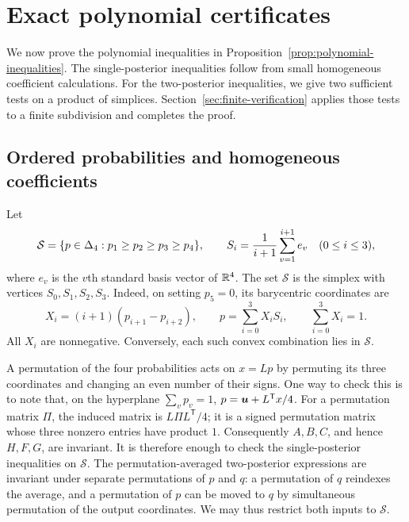 \section{Exact polynomial certificates}
\label{sec:polynomial-certificates}

We now prove the polynomial inequalities in
Proposition~\ref{prop:polynomial-inequalities}. The single-posterior
inequalities follow from small homogeneous coefficient calculations. For the
two-posterior inequalities, we give two sufficient tests on a product of
simplices. Section~\ref{sec:finite-verification} applies those tests to a
finite subdivision and completes the proof.

\subsection{Ordered probabilities and homogeneous coefficients}

Let
\[
 \mathcal S=\{p\in\Delta_4:p_1\ge p_2\ge p_3\ge p_4\},
 \qquad
 S_i=\frac{1}{i+1}\sum_{v=1}^{i+1}e_v
 \quad(0\le i\le3),
\]
where $e_v$ is the $v$th standard basis vector of $\mathbb R^4$.
The set $\mathcal S$ is the simplex with vertices $S_0,S_1,S_2,S_3$.
Indeed, on setting $p_5=0$, its barycentric coordinates are
\begin{equation}
 X_i=(i+1)(p_{i+1}-p_{i+2}),\qquad
 p=\sum_{i=0}^3X_iS_i,\qquad \sum_{i=0}^3X_i=1.
 \label{eq:ordered-barycentric}
\end{equation}
All $X_i$ are nonnegative. Conversely, each such convex combination lies
in $\mathcal S$.

A permutation of the four probabilities acts on $x=Lp$ by permuting its
three coordinates and changing an even number of their signs. One way to
check this is to note that, on the hyperplane $\sum_vp_v=1$,
$p=\boldsymbol u+L^{\mathsf T}x/4$. For a permutation matrix $\Pi$, the induced
matrix is $L\Pi L^{\mathsf T}/4$; it is a signed permutation matrix whose
three nonzero entries have product $1$. Consequently $A,B,C$, and hence
$H,F,G$, are invariant. It is therefore enough to check the
single-posterior inequalities on $\mathcal S$. The permutation-averaged
two-posterior expressions are invariant under separate permutations of
$p$ and $q$: a permutation of $q$ reindexes the average, and a permutation
of $p$ can be moved to $q$ by simultaneous permutation of the output
coordinates. We may thus restrict both inputs to $\mathcal S$.

